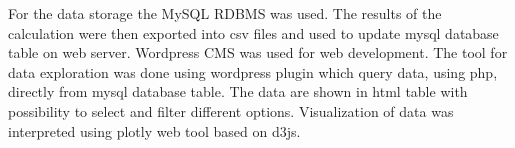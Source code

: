 For the data storage the MySQL RDBMS was used.
The results of the calculation were then exported into csv files and used to update mysql database table on web server. Wordpress CMS was used for web development. The tool for data exploration was done using wordpress plugin which query data, using php, directly from mysql database table. The data are shown in html table with possibility to select and filter different options. Visualization of data was interpreted using plotly web tool based on d3js.  

